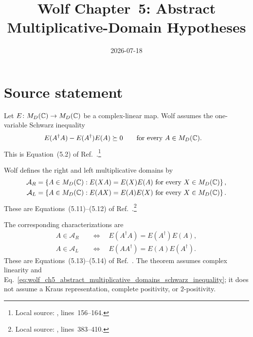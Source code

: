 \documentclass{article}
\title{Wolf Chapter~5: Abstract Multiplicative-Domain Hypotheses}
\author{}
\date{2026-07-18}
\begin{document}
\maketitle
{}

\section{Source statement}

Let $E\colon M_D(\mathbb{C})\to M_D(\mathbb{C})$ be a complex-linear map. Wolf assumes the one-variable
Schwarz inequality
\begin{align}
    E(A^\dagger A)-E(A^\dagger)E(A)&\succeq 0
    \qquad\text{for every $A\in M_D(\mathbb{C})$}.
    \label{eq:wolf_ch5_abstract_multiplicative_domains_schwarz_inequality}
\end{align}
This is Equation~(5.2) of Ref.~\cite{Wolf2012Quantum}.\footnote{Local source:
,
lines~156--164.}

Wolf defines the right and left multiplicative domains by
\begin{align}
    \mathcal A_R
        &=\left\{A\in M_D(\mathbb{C}):
            E(XA)=E(X)E(A)
            \ \text{for every $X\in M_D(\mathbb{C})$}\right\},
    \label{eq:wolf_ch5_abstract_multiplicative_domains_right_domain}\\
    \mathcal A_L
        &=\left\{A\in M_D(\mathbb{C}):
            E(AX)=E(A)E(X)
            \ \text{for every $X\in M_D(\mathbb{C})$}\right\}.
    \label{eq:wolf_ch5_abstract_multiplicative_domains_left_domain}
\end{align}
These are Equations~(5.11)--(5.12) of
Ref.~\cite{Wolf2012Quantum}.\footnote{Local source:
,
lines~383--410.}

The corresponding characterizations are
\begin{align}
    A\in\mathcal A_R
        &\quad\Longleftrightarrow\quad
        E(A^\dagger A)=E(A^\dagger)E(A),
    \label{eq:wolf_ch5_abstract_multiplicative_domains_right_characterization}\\
    A\in\mathcal A_L
        &\quad\Longleftrightarrow\quad
        E(AA^\dagger)=E(A)E(A^\dagger).
    \label{eq:wolf_ch5_abstract_multiplicative_domains_left_characterization}
\end{align}
These are Equations~(5.13)--(5.14) of
Ref.~\cite{Wolf2012Quantum}. The theorem assumes complex linearity and
Eq.~\ref{eq:wolf_ch5_abstract_multiplicative_domains_schwarz_inequality}; it
does not assume a Kraus representation, complete positivity, or
$2$-positivity.
\end{document}

